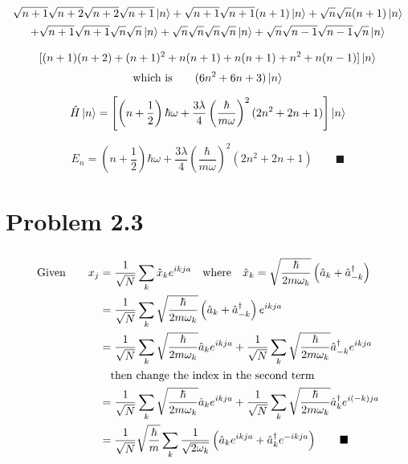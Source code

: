 \documentclass{amsart}
\begin{document}
\begin{multline*}
\sqrt{n+1}\sqrt{n+2}\sqrt{n+2}\sqrt{n+1}\ket{n}+\sqrt{n+1}\sqrt{n+1}(n+1)\ket{n}+\sqrt{n}\sqrt{n}(n+1)\ket{n}\\+\sqrt{n+1}\sqrt{n+1}\sqrt{n}\sqrt{n}\ket{n}+\sqrt{n}\sqrt{n}\sqrt{n}\sqrt{n}\ket{n}+\sqrt{n}\sqrt{n-1}\sqrt{n-1}\sqrt{n}\ket{n}
\end{multline*}

\[[(n+1)(n+2)+(n+1)^2+n(n+1)+n(n+1)+n^2+n(n-1)]\ket{n}\]
\[\text{which is}\qquad(6n^2+6n+3)\ket{n}\]

\[\hat{H}\ket{n}=\left[\left(n+\frac{1}{2}\right)\hbar\omega+\frac{3\lambda}{4}\left(\frac{\hbar}{m\omega}\right)^2(2n^2+2n+1)\right]\ket{n}\]

\[E_n=\left(n+\frac{1}{2}\right)\hbar\omega+\frac{3\lambda}{4}\left(\frac{\hbar}{m\omega}\right)^2(2n^2+2n+1)\qquad\blacksquare\]

\section*{Problem 2.3}
\[\]
\begin{align*}
    \text{Given}\qquad x_j&=\frac{1}{\sqrt{N}}\sum_k \tilde{x}_k e^{ikja}\qq{where} \hat{x}_k=\sqrt{\frac{\hbar}{2m\omega_k}}\left(\hat{a}_k+\hat{a}^\dagger_{-k}\right)\\
    &=\frac{1}{\sqrt{N}}\sum_k \sqrt{\frac{\hbar}{2m\omega_k}}\left(\hat{a}_k+\hat{a}^\dagger_{-k}\right) e^{ikja}\\
    &=\frac{1}{\sqrt{N}}\sum_k \sqrt{\frac{\hbar}{2m\omega_k}}\hat{a}_k e^{ikja}+\frac{1}{\sqrt{N}}\sum_k \sqrt{\frac{\hbar}{2m\omega_k}}\hat{a}^\dagger_{-k} e^{ikja}\\
    &\qq{then change the index in the second term}\\
    &=\frac{1}{\sqrt{N}}\sum_k \sqrt{\frac{\hbar}{2m\omega_k}}\hat{a}_k e^{ikja}+\frac{1}{\sqrt{N}}\sum_k \sqrt{\frac{\hbar}{2m\omega_{k}}}\hat{a}^\dagger_{k} e^{i(-k)ja}\\
    &=\frac{1}{\sqrt{N}}\sqrt{\frac{\hbar}{m}}\sum_k \frac{1}{\sqrt{2\omega_k}}\left(\hat{a}_k e^{ikja}+\hat{a}^\dagger_{k} e^{-ikja}\right)\qquad\blacksquare
\end{align*}
\end{document}

